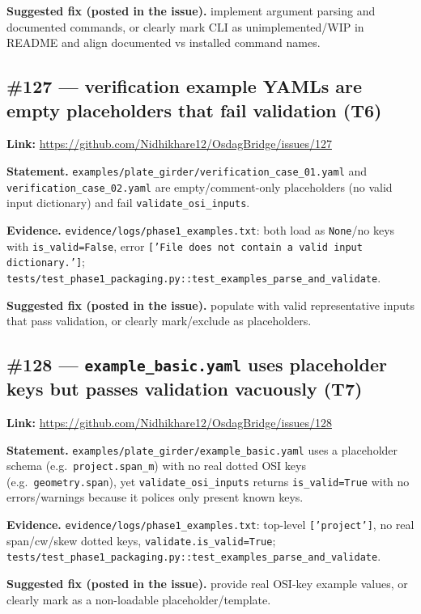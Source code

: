 \textbf{Suggested fix (posted in the issue).} implement argument parsing and documented commands, or clearly mark CLI as unimplemented/WIP in README and align documented vs installed command names.

\subsection{\#127 --- verification example YAMLs are empty placeholders that fail validation (T6)}
\textbf{Link:} \url{https://github.com/Nidhikhare12/OsdagBridge/issues/127}

\textbf{Statement.} \texttt{examples/plate\_girder/verification\_case\_01.yaml} and \texttt{verification\_case\_02.yaml} are empty/comment-only placeholders (no valid input dictionary) and fail \texttt{validate\_osi\_inputs}.

\textbf{Evidence.} \texttt{evidence/logs/phase1\_examples.txt}: both load as \texttt{None}/no keys with \texttt{is\_valid=False}, error \texttt{['File does not contain a valid input dictionary.']}; \texttt{tests/test\_phase1\_packaging.py::test\_examples\_parse\_and\_validate}.

\textbf{Suggested fix (posted in the issue).} populate with valid representative inputs that pass validation, or clearly mark/exclude as placeholders.

\subsection{\#128 --- \texttt{example\_basic.yaml} uses placeholder keys but passes validation vacuously (T7)}
\textbf{Link:} \url{https://github.com/Nidhikhare12/OsdagBridge/issues/128}

\textbf{Statement.} \texttt{examples/plate\_girder/example\_basic.yaml} uses a placeholder schema (e.g.\ \texttt{project.span\_m}) with no real dotted OSI keys (e.g.\ \texttt{geometry.span}), yet \texttt{validate\_osi\_inputs} returns \texttt{is\_valid=True} with no errors/warnings because it polices only present known keys.

\textbf{Evidence.} \texttt{evidence/logs/phase1\_examples.txt}: top-level \texttt{['project']}, no real span/cw/skew dotted keys, \texttt{validate.is\_valid=True}; \texttt{tests/test\_phase1\_packaging.py::test\_examples\_parse\_and\_validate}.

\textbf{Suggested fix (posted in the issue).} provide real OSI-key example values, or clearly mark as a non-loadable placeholder/template.

